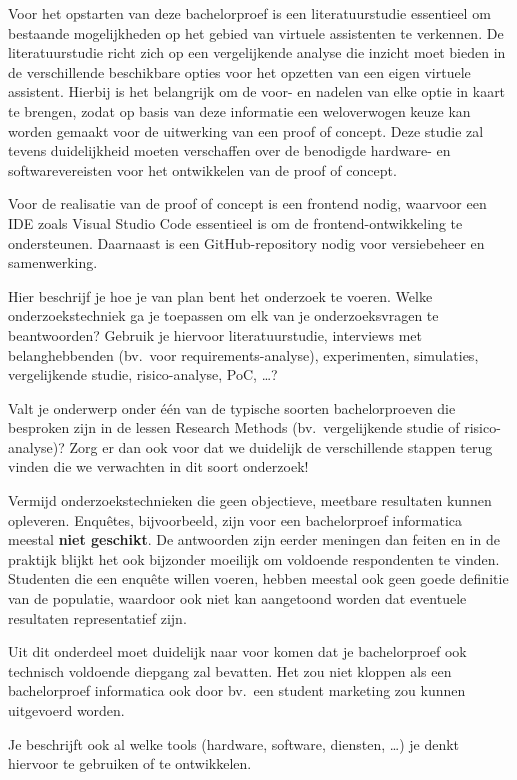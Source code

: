 Voor het opstarten van deze bachelorproef is een literatuurstudie essentieel om bestaande mogelijkheden op het gebied van virtuele assistenten te verkennen. De literatuurstudie richt zich op een vergelijkende analyse die inzicht moet bieden in de verschillende beschikbare opties voor het opzetten van een eigen virtuele assistent. Hierbij is het belangrijk om de voor- en nadelen van elke optie in kaart te brengen, zodat op basis van deze informatie een weloverwogen keuze kan worden gemaakt voor de uitwerking van een proof of concept. Deze studie zal tevens duidelijkheid moeten verschaffen over de benodigde hardware- en softwarevereisten voor het ontwikkelen van de proof of concept.

Voor de realisatie van de proof of concept is een frontend nodig, waarvoor een IDE zoals Visual Studio Code essentieel is om de frontend-ontwikkeling te ondersteunen. Daarnaast is een GitHub-repository nodig voor versiebeheer en samenwerking.

Hier beschrijf je hoe je van plan bent het onderzoek te voeren. Welke onderzoekstechniek ga je toepassen om elk van je onderzoeksvragen te beantwoorden? Gebruik je hiervoor literatuurstudie, interviews met belanghebbenden (bv.~voor requirements-analyse), experimenten, simulaties, vergelijkende studie, risico-analyse, PoC, \ldots?

Valt je onderwerp onder één van de typische soorten bachelorproeven die besproken zijn in de lessen Research Methods (bv.\ vergelijkende studie of risico-analyse)? Zorg er dan ook voor dat we duidelijk de verschillende stappen terug vinden die we verwachten in dit soort onderzoek!

Vermijd onderzoekstechnieken die geen objectieve, meetbare resultaten kunnen opleveren. Enquêtes, bijvoorbeeld, zijn voor een bachelorproef informatica meestal \textbf{niet geschikt}. De antwoorden zijn eerder meningen dan feiten en in de praktijk blijkt het ook bijzonder moeilijk om voldoende respondenten te vinden. Studenten die een enquête willen voeren, hebben meestal ook geen goede definitie van de populatie, waardoor ook niet kan aangetoond worden dat eventuele resultaten representatief zijn.

Uit dit onderdeel moet duidelijk naar voor komen dat je bachelorproef ook technisch voldoen\-de diepgang zal bevatten. Het zou niet kloppen als een bachelorproef informatica ook door bv.\ een student marketing zou kunnen uitgevoerd worden.

Je beschrijft ook al welke tools (hardware, software, diensten, \ldots) je denkt hiervoor te gebruiken of te ontwikkelen.

